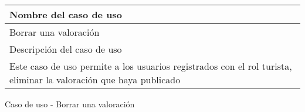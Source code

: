 \begin{identificacionCasoDeUso}
	\begin{tabular} { | p{17cm} |}

		\hline
		Nombre del caso de uso                                                                                            \\ \hline
		Borrar una valoración                                                                                             \\ \hline
		Descripción del caso de uso                                                                                       \\ \hline
		Este caso de uso permite a los usuarios registrados con el rol turista, eliminar la valoración que haya publicado \\ \hline
	\end{tabular}
	\caption{Caso de uso - Borrar una valoración}
\end{identificacionCasoDeUso}